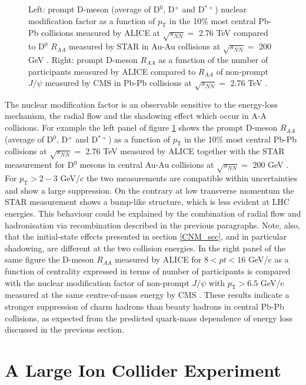 \documentclass[b5paper,10pt,twoside,oldstyle,classica]{toptesi}
\newcommand{\pt}{p_\text{T}}
\begin{document}
\begin{figure}[tb]
\begin{center}
\caption{Left: prompt D-meson (average of D$^0$, D$^+$ and D$^{*+}$) nuclear modification factor as a function of $\pt$ in the 10\% most central Pb-Pb collisions measured by ALICE at $\sqrt{s_{NN}} = $ 2.76 TeV compared to D$^0$ $R_{AA}$ measured by STAR in Au-Au collisions at $\sqrt{s_{NN}} = $ 200 GeV \cite{Adam:2015sza}. Right: prompt D-meson $R_{AA}$ as a function of the number of participants measured by ALICE compared to $R_{AA}$ of non-prompt $J/\psi$ measured by CMS in Pb-Pb collisions at $\sqrt{s_{NN}} = $ 2.76 TeV \cite{Rossi:2014gma}.}
\label{RPbPb}
\end{center}
\end{figure}
The nuclear modification factor is an observable sensitive to the energy-loss mechanism, the radial flow and the shadowing effect which occur in A-A collisions. For example the left panel of figure \ref{RPbPb} shows the prompt D-meson $R_{AA}$ (average of D$^0$, D$^+$ and D$^{*+}$) as a function of $\pt$ in the 10\% most central Pb-Pb collisions at $\sqrt{s_{NN}} = $ 2.76 TeV measured by ALICE \cite{Adam:2015sza} together with the STAR measurement for D$^0$ mesons in central Au-Au collisions at $\sqrt{s_{NN}} = $ 200 GeV \cite{Adamczyk:2014uip}. For $\pt > 2-3$ GeV/c the two measurements are compatible within uncertainties and show a large suppression. On the contrary at low transverse momentum the STAR measurement shows a bump-like structure, which is less evident at LHC energies. This behaviour could be explained by the combination of radial flow and hadronisation via recombination described in the previous paragraphs. Note, also, that the initial-state effects presented in section \ref{CNM_sec}, and in particular shadowing, are different at the two collision energies. In the right panel of the same figure the D-meson $R_{AA}$ measured by ALICE for $8<pt<16$ GeV/c as a function of centrality expressed in terms of number of participants is compared with the nuclear modification factor of non-prompt $J/\psi$ with $\pt>6.5$ GeV/c measured at the same centre-of-mass energy by CMS \cite{Rossi:2014gma}. These results indicate a stronger suppression of charm hadrons than beauty hadrons in central Pb-Pb collisions, as expected from the predicted quark-mass dependence of energy loss discussed in the previous section.
\chapter{A Large Ion Collider Experiment}
\end{document}
